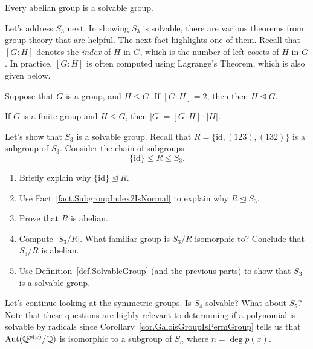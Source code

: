 \begin{theorem}
Every abelian group is a solvable group.
\end{theorem}

Let's address $S_3$ next. In showing $S_3$ is solvable, there are various theorems from group theory that are helpful. The next fact highlights one of them. Recall that $[G:H]$ denotes the \emph{index} of $H$ in $G$, which is the number of left cosets of $H$ in $G$. In practice, $[G:H]$ is often computed using Lagrange's Theorem, which is also given below. 

\begin{fact}\label{fact.SubgroupIndex2IsNormal}
Suppose that $G$ is a group, and $H\le G$. If $[G:H]=2$, then then $H\trianglelefteq G$.
\end{fact}

\begin{fact}\label{thm.Lagrange}
If $G$ is a finite group and $H\le G$, then $|G| = [G:H]\cdot|H|$.
\end{fact}

\begin{problem}
Let's show that $S_3$ is a solvable group. Recall that $R = \{\text{id},(123),(132)\}$ is a subgroup of $S_3$. Consider the chain of subgroups \[\{\text{id}\} \le R \le S_3.\]
\begin{enumerate}
\item Briefly explain why $\{\text{id}\} \trianglelefteq R$.
\item Use Fact~\ref{fact.SubgroupIndex2IsNormal} to explain why $R\trianglelefteq S_3$.
\item Prove that $R$ is abelian.
\item Compute $|S_3/R|$. What familiar group is  $S_3/R$ isomorphic to? Conclude that $S_3/R$ is abelian.
\item Use Definition~\ref{def.SolvableGroup} (and the previous parts) to show that $S_3$ is a solvable group.
\end{enumerate}
\end{problem}

Let's continue looking at the symmetric groups. Is $S_4$ solvable? What about $S_5$? Note that these  questions are highly relevant to determining if a polynomial is solvable by radicals since Corollary~\ref{cor.GaloisGroupIsPermGroup} tells us that $\operatorname{Aut}(\mathbb{Q}^{p(x)}/\mathbb{Q})$ is isomorphic to a subgroup of $S_n$  where $n = \deg p(x)$.

